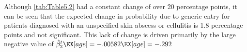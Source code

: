 \indent Although \autoref{tab:Table5.2} had a constant change of over 20 percentage points, it can be seen that the expected change in probability due to generic entry for patients diagnosed with an unspecified skin abscess or cellulitis is 1.8 percentage points and not significant. This lack of change is driven primarily by the large negative value of $\hat{\beta}_2^t\EX[age] = -.00582\EX[age] = -.292$
\begin{landscape}

\end{landscape}
